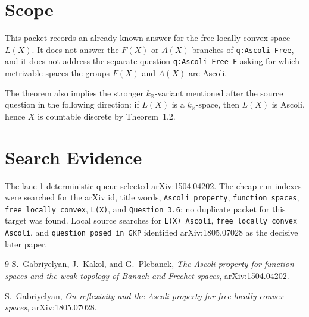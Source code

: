 \documentclass[11pt]{article}
\newcommand{\KR}{k_{\mathbb R}}
\begin{document}
\section*{Scope}

This packet records an already-known answer for the free locally convex space
\(L(X)\). It does not answer the \(F(X)\) or \(A(X)\) branches of
\texttt{q:Ascoli-Free}, and it does not address the separate question
\texttt{q:Ascoli-Free-F} asking for which metrizable spaces the groups
\(F(X)\) and \(A(X)\) are Ascoli.

The theorem also implies the stronger \(\KR\)-variant mentioned after the
source question in the following direction: if \(L(X)\) is a \(\KR\)-space,
then \(L(X)\) is Ascoli, hence \(X\) is countable discrete by Theorem~1.2.

\section*{Search Evidence}

The lane-1 deterministic queue selected arXiv:1504.04202. The cheap run
indexes were searched for the arXiv id, title words, \texttt{Ascoli property},
\texttt{function spaces}, \texttt{free locally convex}, \texttt{L(X)}, and
\texttt{Question 3.6}; no duplicate packet for this target was found. Local
source searches for \texttt{L(X) Ascoli}, \texttt{free locally convex Ascoli},
and \texttt{question posed in GKP} identified arXiv:1805.07028 as the decisive
later paper.

\begin{thebibliography}{9}
S.~Gabriyelyan, J.~Kakol, and G.~Plebanek,
\emph{The Ascoli property for function spaces and the weak topology of Banach
and Frechet spaces},
arXiv:1504.04202.

S.~Gabriyelyan,
\emph{On reflexivity and the Ascoli property for free locally convex spaces},
arXiv:1805.07028.
\end{thebibliography}
\end{document}
